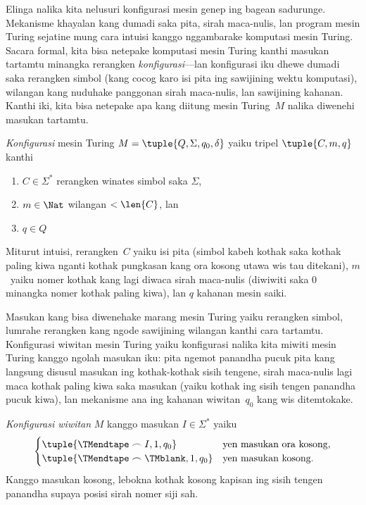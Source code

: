 \documentclass[../../../include/open-logic-section]{subfiles}
\begin{document}

\begin{explain}
Elinga nalika kita nelusuri konfigurasi mesin genep
ing bagean sadurunge. Mekanisme khayalan kang dumadi
saka pita, sirah maca-nulis, lan program mesin Turing
sejatine mung cara intuisi kanggo nggambarake
komputasi mesin Turing. Sacara formal, kita bisa
netepake komputasi mesin Turing kanthi masukan tartamtu
minangka rerangken \emph{konfigurasi}---lan konfigurasi
iku dhewe dumadi saka rerangken simbol (kang cocog
karo isi pita ing sawijining wektu komputasi),
wilangan kang nuduhake panggonan sirah maca-nulis,
lan sawijining kahanan. Kanthi iki, kita bisa
netepake apa kang diitung mesin Turing~$M$
nalika diwenehi masukan tartamtu.
\end{explain}

\begin{defn}[Konfigurasi]
\emph{Konfigurasi} mesin Turing $M = \tuple{Q, \Sigma, q_0,
\delta}$ yaiku tripel $\tuple{C, m, q}$ kanthi
\begin{enumerate}
\item $C \in \Sigma^*$ rerangken winates simbol saka $\Sigma$,
\item $m \in \Nat$ wilangan $< \len{C}$, lan
\item $q \in Q$
\end{enumerate}
Miturut intuisi, rerangken~$C$ yaiku isi pita
(simbol kabeh kothak saka kothak paling kiwa
nganti kothak pungkasan kang ora kosong utawa
wis tau ditekani), $m$~yaiku nomer kothak
kang lagi diwaca sirah maca-nulis (diwiwiti
saka $0$ minangka nomer kothak paling kiwa),
lan $q$ kahanan mesin saiki.
\end{defn}

\begin{explain}
Masukan kang bisa diwenehake marang mesin Turing
yaiku rerangken simbol, lumrahe rerangken kang
ngode sawijining wilangan kanthi cara tartamtu.
Konfigurasi wiwitan mesin Turing yaiku konfigurasi
nalika kita miwiti mesin Turing kanggo ngolah
masukan iku: pita ngemot panandha pucuk pita
kang langsung disusul masukan ing kothak-kothak
sisih tengene, sirah maca-nulis lagi maca
kothak paling kiwa saka masukan (yaiku kothak
ing sisih tengen panandha pucuk kiwa), lan
mekanisme ana ing kahanan wiwitan~$q_0$
kang wis ditemtokake.
\end{explain}

\begin{defn}
\emph{Konfigurasi wiwitan} $M$ kanggo masukan
$I \in \Sigma^*$ yaiku
\[
\begin{cases}
\tuple{\TMendtape \frown I, 1, q_0} & \text{yen masukan ora kosong},\\
\tuple{\TMendtape \frown \TMblank, 1, q_0} & \text{yen masukan kosong}.
\end{cases}
\]
Kanggo masukan kosong, lebokna kothak kosong kapisan ing sisih tengen panandha supaya posisi sirah nomer siji sah. \end{defn}
\end{document}
